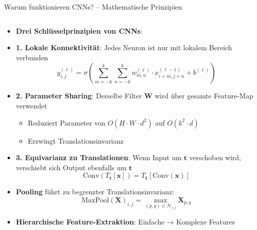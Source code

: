 \documentclass[aspectratio=1610, xcolor=dvipsnames, 9pt]{beamer}
\begin{document}
      \begin{frame}{Warum funktionieren CNNs? -- Mathematische Prinzipien}
        \begin{columns}
          \begin{column}{1\textwidth}
            \begin{itemize}
              \item \textbf{Drei Schlüsselprinzipien von CNNs}:
              \item \textbf{1. Lokale Konnektivität}: Jedes Neuron ist nur mit lokalem Bereich verbunden
              \begin{equation}
                y_{i,j}^{(\ell)} = \sigma\left(\sum_{m=-k}^{k} \sum_{n=-k}^{k} w_{m,n}^{(\ell)} \cdot x_{i+m,j+n}^{(\ell-1)} + b^{(\ell)}\right)
              \end{equation}
              \item \textbf{2. Parameter Sharing}: Derselbe Filter $\mathbf{W}$ wird über gesamte Feature-Map verwendet
              \begin{itemize}
                \item Reduziert Parameter von $O(H \cdot W \cdot d^2)$ auf $O(k^2 \cdot d)$
                \item Erzwingt Translationsinvarianz
              \end{itemize}
              \item \textbf{3. Equivarianz zu Translationen}: Wenn Input um $\mathbf{t}$ verschoben wird, verschiebt sich Output ebenfalls um $\mathbf{t}$
              \begin{equation}
                \text{Conv}(T_\mathbf{t}[\mathbf{x}]) = T_\mathbf{t}[\text{Conv}(\mathbf{x})]
              \end{equation}
              \item \textbf{Pooling} führt zu begrenzter Translationsinvarianz:
              \begin{equation}
                \text{MaxPool}(\mathbf{X})_{i,j} = \max_{(p,q) \in \mathcal{N}_{i,j}} \mathbf{X}_{p,q}
              \end{equation}
              \item \textbf{Hierarchische Feature-Extraktion}: Einfache → Komplexe Features
            \end{itemize}
          \end{column}
        \end{columns}
      \end{frame}
\end{document}
